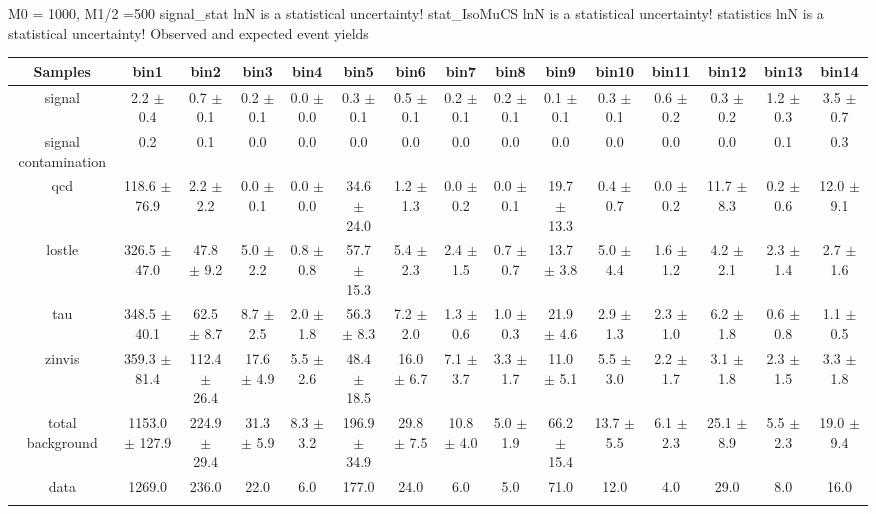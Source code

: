 M0 = 1000, M1/2 =500
signal_stat lnN is a statistical uncertainty!
stat_IsoMuCS lnN is a statistical uncertainty!
statistics lnN is a statistical uncertainty!
Observed and expected event yields
\begin{tabular}{ccccccccccccccc}
             Samples &                bin1 &              bin2 &            bin3 &           bin4 &              bin5 &            bin6 &            bin7 &           bin8 &             bin9 &           bin10 &          bin11 &           bin12 &          bin13 &           bin14\\ \hline
signal               & 2.2 $\pm$ 0.4       & 0.7 $\pm$ 0.1     & 0.2 $\pm$ 0.1   & 0.0 $\pm$ 0.0  & 0.3 $\pm$ 0.1     & 0.5 $\pm$ 0.1   & 0.2 $\pm$ 0.1   & 0.2 $\pm$ 0.1  & 0.1 $\pm$ 0.1    & 0.3 $\pm$ 0.1   & 0.6 $\pm$ 0.2  & 0.3 $\pm$ 0.2   & 1.2 $\pm$ 0.3  & 3.5 $\pm$ 0.7  \\
signal contamination & 0.2                 & 0.1               & 0.0             & 0.0            & 0.0               & 0.0             & 0.0             & 0.0            & 0.0              & 0.0             & 0.0            & 0.0             & 0.1            & 0.3            \\
qcd                  & 118.6 $\pm$ 76.9    & 2.2 $\pm$ 2.2     & 0.0 $\pm$ 0.1   & 0.0 $\pm$ 0.0  & 34.6 $\pm$ 24.0   & 1.2 $\pm$ 1.3   & 0.0 $\pm$ 0.2   & 0.0 $\pm$ 0.1  & 19.7 $\pm$ 13.3  & 0.4 $\pm$ 0.7   & 0.0 $\pm$ 0.2  & 11.7 $\pm$ 8.3  & 0.2 $\pm$ 0.6  & 12.0 $\pm$ 9.1 \\
lostle               & 326.5 $\pm$ 47.0    & 47.8 $\pm$ 9.2    & 5.0 $\pm$ 2.2   & 0.8 $\pm$ 0.8  & 57.7 $\pm$ 15.3   & 5.4 $\pm$ 2.3   & 2.4 $\pm$ 1.5   & 0.7 $\pm$ 0.7  & 13.7 $\pm$ 3.8   & 5.0 $\pm$ 4.4   & 1.6 $\pm$ 1.2  & 4.2 $\pm$ 2.1   & 2.3 $\pm$ 1.4  & 2.7 $\pm$ 1.6  \\
tau                  & 348.5 $\pm$ 40.1    & 62.5 $\pm$ 8.7    & 8.7 $\pm$ 2.5   & 2.0 $\pm$ 1.8  & 56.3 $\pm$ 8.3    & 7.2 $\pm$ 2.0   & 1.3 $\pm$ 0.6   & 1.0 $\pm$ 0.3  & 21.9 $\pm$ 4.6   & 2.9 $\pm$ 1.3   & 2.3 $\pm$ 1.0  & 6.2 $\pm$ 1.8   & 0.6 $\pm$ 0.8  & 1.1 $\pm$ 0.5  \\
zinvis               & 359.3 $\pm$ 81.4    & 112.4 $\pm$ 26.4  & 17.6 $\pm$ 4.9  & 5.5 $\pm$ 2.6  & 48.4 $\pm$ 18.5   & 16.0 $\pm$ 6.7  & 7.1 $\pm$ 3.7   & 3.3 $\pm$ 1.7  & 11.0 $\pm$ 5.1   & 5.5 $\pm$ 3.0   & 2.2 $\pm$ 1.7  & 3.1 $\pm$ 1.8   & 2.3 $\pm$ 1.5  & 3.3 $\pm$ 1.8  \\
total background     & 1153.0 $\pm$ 127.9  & 224.9 $\pm$ 29.4  & 31.3 $\pm$ 5.9  & 8.3 $\pm$ 3.2  & 196.9 $\pm$ 34.9  & 29.8 $\pm$ 7.5  & 10.8 $\pm$ 4.0  & 5.0 $\pm$ 1.9  & 66.2 $\pm$ 15.4  & 13.7 $\pm$ 5.5  & 6.1 $\pm$ 2.3  & 25.1 $\pm$ 8.9  & 5.5 $\pm$ 2.3  & 19.0 $\pm$ 9.4 \\
data                 & 1269.0              & 236.0             & 22.0            & 6.0            & 177.0             & 24.0            & 6.0             & 5.0            & 71.0             & 12.0            & 4.0            & 29.0            & 8.0            & 16.0           \\
\label{tab:xyz}
\caption{Given systematics are simple quadric-sums, and not what is used for limit calculation where the correlations are considered.}
\end{tabular}

